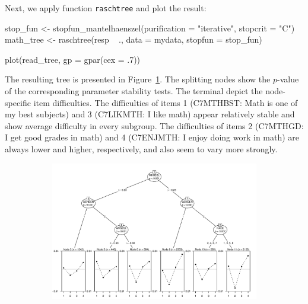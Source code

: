 \documentclass[doc,floatsintext,natbib]{apa7}
\begin{document}
Next, we apply function \verb|raschtree| and plot the result:

\begin{Schunk}
\begin{Sinput}
 stop_fun <- stopfun_mantelhaenszel(purification = "iterative", stopcrit = "C")
 math_tree <- raschtree(resp ~ ., data = mydata, stopfun = stop_fun)
\end{Sinput}
\end{Schunk}

\begin{Schunk}
\begin{Sinput}
 plot(read_tree, gp = gpar(cex = .7))
\end{Sinput}
\end{Schunk}

The resulting tree is presented in Figure~\ref{fig:math_tree}. The splitting nodes show the $p$-value of the corresponding parameter stability tests. The terminal depict the node-specific item difficulties. The difficulties of items 1 (C7MTHBST: Math is one of my best subjects) and 3 (C7LIKMTH: I like math) appear relatively stable and show average difficulty in every subgroup. The difficulties of items 2 (C7MTHGD: I get good grades in math) and 4 (C7ENJMTH: I enjoy doing work in math) are always lower and higher, respectively, and also seem to vary more strongly. 



\begin{figure}%
\caption{Rasch tree for the four math items.}
\begin{subfigure}{1.25\textwidth}
\includegraphics{MOB_paper-018}
\end{subfigure}
\label{fig:math_tree}
\end{figure}%
\end{document}
